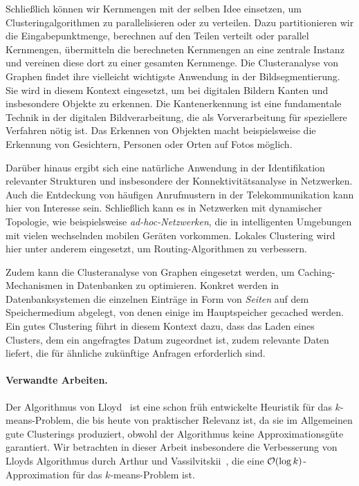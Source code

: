 Schließlich können wir Kernmengen mit der selben Idee einsetzen, um Clusteringalgorithmen zu parallelisieren oder zu verteilen.
Dazu partitionieren wir die Eingabepunktmenge, berechnen auf den Teilen verteilt oder parallel Kernmengen, übermitteln die
berechneten Kernmengen an eine zentrale Instanz und vereinen diese dort zu einer gesamten Kernmenge.
\absatz
Die Clusteranalyse von Graphen findet ihre vielleicht wichtigste Anwendung in der Bildsegmentierung. Sie wird in diesem
Kontext eingesetzt, um bei digitalen Bildern Kanten und insbesondere Objekte zu erkennen. Die Kantenerkennung ist eine
fundamentale Technik in der digitalen Bildverarbeitung, die als Vorverarbeitung für speziellere Verfahren nötig ist. Das Erkennen
von Objekten macht beispielsweise die Erkennung von Gesichtern, Personen oder Orten auf Fotos möglich.

Darüber hinaus ergibt sich eine natürliche Anwendung in der Identifikation relevanter Strukturen und insbesondere der
Konnektivitätsanalyse in Netzwerken. Auch die Entdeckung von häufigen Anrufmustern in der Telekommunikation kann hier
von Interesse sein. Schließlich kann es in Netzwerken mit dynamischer Topologie, wie beispielsweise \emph{ad-hoc-Netzwerken},
die in intelligenten Umgebungen mit vielen wechselnden mobilen Geräten vorkommen. Lokales Clustering
wird hier unter anderem eingesetzt, um Routing-Algorithmen zu verbessern.

Zudem kann die Clusteranalyse von Graphen eingesetzt werden, um Caching-Mechanismen in Datenbanken zu optimieren.
Konkret werden in Datenbanksystemen die einzelnen Einträge in Form von \emph{Seiten} auf dem Speichermedium abgelegt,
von denen einige im Hauptspeicher gecached werden. Ein gutes Clustering führt in diesem Kontext dazu, dass das Laden eines
Clusters, dem ein angefragtes Datum zugeordnet ist, zudem relevante Daten liefert, die für ähnliche zukünftige Anfragen
erforderlich sind.

\paragraph{Verwandte Arbeiten.} Der Algorithmus von Lloyd~\cite{Lloyd82} ist eine schon früh entwickelte Heuristik für das
$k$-means-Problem, die bis heute von praktischer Relevanz ist, da sie im Allgemeinen gute Clusterings produziert, obwohl
der Algorithmus keine Approximationsgüte garantiert. Wir betrachten in dieser Arbeit insbesondere die Verbesserung von
Lloyds Algorithmus durch Arthur und Vassilvitskii~\citep{ArthurV07}, die eine $\mathcal{O}(\log k)$-Approximation für das
$k$-means-Problem ist.

